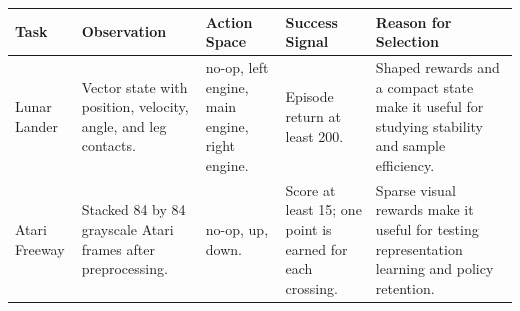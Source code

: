 \begin{tabularx}{\textwidth}{@{}>{\raggedright\arraybackslash}p{}>{\raggedright\arraybackslash}p{}>{\raggedright\arraybackslash}p{}>{\raggedright\arraybackslash}p{}Y@{}}
\toprule
\textbf{Task} & \textbf{Observation} & \textbf{Action Space} & \textbf{Success Signal} & \textbf{Reason for Selection} \\
\midrule
Lunar Lander & Vector state with position, velocity, angle, and leg contacts. & no-op, left engine, main engine, right engine. & Episode return at least 200. & Shaped rewards and a compact state make it useful for studying stability and sample efficiency. \\
Atari Freeway & Stacked 84 by 84 grayscale Atari frames after preprocessing. & no-op, up, down. & Score at least 15; one point is earned for each crossing. & Sparse visual rewards make it useful for testing representation learning and policy retention. \\
\bottomrule
\end{tabularx}
